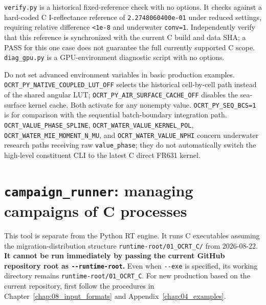 \texttt{verify.\allowbreak{}py} is a historical fixed-reference check with no options. It checks against a hard-coded C I-reflectance reference of \texttt{2.\allowbreak{}2748060400e-\allowbreak{}01} under reduced settings, requiring relative difference \texttt{<1e-\allowbreak{}8} and underwater \texttt{conv=\allowbreak{}1}. Independently verify that this reference is synchronized with the current C build and data SHA; a PASS for this one case does not guarantee the full currently supported C scope. \texttt{diag\_\allowbreak{}gpu.\allowbreak{}py} is a GPU-environment diagnostic script with no options.

Do not set advanced environment variables in basic production examples. \texttt{OCRT\_\allowbreak{}PY\_\allowbreak{}NATIVE\_\allowbreak{}COUPLED\_\allowbreak{}LUT\_\allowbreak{}OFF} selects the historical cell-by-cell path instead of the shared angular LUT; \texttt{OCRT\_\allowbreak{}PY\_\allowbreak{}AIR\_\allowbreak{}SURFACE\_\allowbreak{}CACHE\_\allowbreak{}OFF} disables the sea-surface kernel cache. Both activate for any nonempty value. \texttt{OCRT\_\allowbreak{}PY\_\allowbreak{}SEQ\_\allowbreak{}BCS=\allowbreak{}1} is for comparison with the sequential batch-boundary integration path. \texttt{OCRT\_\allowbreak{}VALUE\_\allowbreak{}PHASE\_\allowbreak{}SPLINE}, \texttt{OCRT\_\allowbreak{}WATER\_\allowbreak{}VALUE\_\allowbreak{}KERNEL\_\allowbreak{}POL}, \texttt{OCRT\_\allowbreak{}WATER\_\allowbreak{}MIE\_\allowbreak{}MOMENT\_\allowbreak{}N\_\allowbreak{}MU}, and \texttt{OCRT\_\allowbreak{}WATER\_\allowbreak{}VALUE\_\allowbreak{}NPHI} concern underwater research paths receiving raw \texttt{value\_\allowbreak{}phase}; they do not automatically switch the high-level constituent CLI to the latest C direct FR631 kernel.

\section{\texttt{campaign\_\allowbreak{}runner}: managing campaigns of C processes}
\label{sec:auto:06_python_batch:10}
This tool is separate from the Python RT engine. It runs C executables assuming the migration-distribution structure \texttt{runtime-\allowbreak{}root/\allowbreak{}01\_\allowbreak{}OCRT\_\allowbreak{}C/\allowbreak{}} from 2026-08-22. \textbf{It cannot be run immediately by passing the current GitHub repository root as \texttt{-\allowbreak{}-\allowbreak{}runtime-\allowbreak{}root}.} Even when \texttt{-\allowbreak{}-\allowbreak{}exe} is specified, its working directory remains \texttt{runtime-\allowbreak{}root/\allowbreak{}01\_\allowbreak{}OCRT\_\allowbreak{}C}. For new production based on the current repository, first follow the procedures in Chapter~\ref{chap:08_input_formats} and Appendix~\ref{chap:04_examples}.


